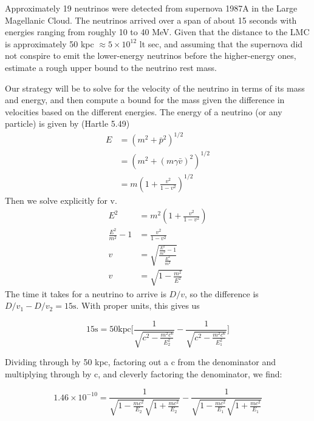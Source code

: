 \documentclass[11pt,largemargins]{homework}
\begin{document}
\question
Approximately 19 neutrinos were detected from supernova 1987A in the Large Magellanic Cloud.  The neutrinos arrived over a span of about 15 seconds with energies ranging from roughly 10 to 40 MeV.  Given that the distance to the LMC is approximately 50 kpc $\approx 5 \times 10^12$ lt sec, and assuming that the supernova did not conspire to emit the lower-energy neutrinos before the higher-energy ones, estimate a rough upper bound to the neutrino rest mass.

Our strategy will be to solve for the velocity of the neutrino in terms of its mass and energy, and then compute a bound for the mass given the difference in velocities based on the different energies.
The energy of a neutrino (or any particle) is given by (Hartle 5.49)
\begin{subequations}
\begin{align}
E &= (m^2 + \bar{p}^2)^{1/2} \\
\nonumber &= (m^2 + (m \gamma \bar{v})^2)^{1/2} \\
\nonumber &= m(1 + \frac{v^2}{1-v^2})^{1/2} 
\end{align}
\end{subequations}
Then we solve explicitly for v.
\begin{subequations}
\begin{align*}
E^2 &= m^2(1 + \frac{v^2}{1-v^2}) \\
\frac{E^2}{m^2} - 1 &= \frac{v^2}{1 - v^2} \\
v &= \sqrt{\frac{\frac{E^2}{m^2} - 1}{\frac{E^2}{m^2}}} \\
v &= \sqrt{1 - \frac{m^2}{E^2}}
\end{align*}
\end{subequations}
The time it takes for a neutrino to arrive is $D/v$, so the difference is $D/v_{1} - D/v_{2} = 15 \mathrm{s}$.  With proper units, this gives us

\begin{equation}
15 \mathrm{s} = 50 \mathrm{kpc} \Bigg[ \frac{1}{\sqrt{c^2 - \frac{m^2 c^6}{E_{2}^2}}} - \frac{1}{\sqrt{{c^2 - \frac{m^2 c^6}{E_{1}^2}}}} \Bigg]
\end{equation}

Dividing through by 50 kpc, factoring out a c from the denominator and multiplying through by c, and cleverly factoring the denominator, we find:

\begin{equation}
1.46 \times 10^{-10} = \frac{1}{\sqrt{1 - \frac{mc^2}{E_2}} \sqrt{1 + \frac{mc^2}{E_2}}} - \frac{1}{\sqrt{1 - \frac{mc^2}{E_1}} \sqrt{1 + \frac{mc^2}{E_1}}}
\end{equation}
\end{document}
